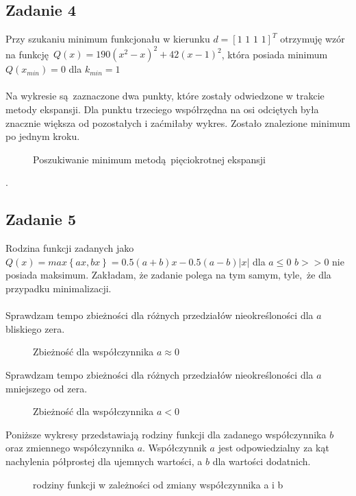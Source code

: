 \documentclass[a4paper, 12pt]{article}
\begin{document}
		\subsection{Zadanie 4}
			Przy szukaniu minimum funkcjonału w kierunku $d = [1\,\, 1\,\, 1\,\, 1]^T$ otrzymuję wzór na funkcję $Q(x) = 190(x^2-x)^2+ 42 (x-1)^2$, która posiada minimum $Q(x_{min}) = 0$ dla $k_{min} = 1$ \\ \\
			Na wykresie są zaznaczone dwa punkty, które zostały odwiedzone w trakcie metody ekspansji. Dla punktu trzeciego współrzędna na osi odciętych była znacznie większa od pozostałych i zaćmiłaby wykres. Zostało znalezione minimum po jednym kroku.
			\begin{figure}[H]
				\centering
				\def \svgwidth{0.7\columnwidth}
				
				\caption{Poszukiwanie minimum metodą pięciokrotnej ekspansji}
			\end{figure}\noindent.
		\subsection{Zadanie 5}
			Rodzina funkcji zadanych jako $Q(x) = max \left\{ax, bx\right\} = 0.5(a + b)x - 0.5(a-b) |x|$  dla $a \leq 0$ $b >> 0$ nie posiada maksimum. Zakładam, że zadanie polega na tym samym, tyle, że dla przypadku minimalizacji. \\ \\
			Sprawdzam tempo zbieżności dla różnych przedziałów nieokreśloności dla $a$ bliskiego zera.
			\begin{figure}[H]
				\centering
				\def \svgwidth{0.7\columnwidth}
				
				\caption{Zbieżność dla współczynnika $a \approx 0 $}
			\end{figure}\noindent
			Sprawdzam tempo zbieżności dla różnych przedziałów nieokreśloności dla $a$ mniejszego od zera.
			\begin{figure}[H]
				\centering
				\def \svgwidth{0.7\columnwidth}
				
				\caption{Zbieżność dla współczynnika $a < 0 $}
			\end{figure}\noindent
			Poniższe wykresy przedstawiają rodziny funkcji dla zadanego współczynnika $b$ oraz zmiennego współczynnika $a$. Współczynnik $a$ jest odpowiedzialny za kąt nachylenia półprostej dla ujemnych wartości, a $b$ dla wartości dodatnich.
			\begin{figure}[H]
				\centering
				\def \svgwidth{\columnwidth}
				
				\caption{rodziny funkcji w zależności od zmiany współczynnika a i b}
			\end{figure}\noindent
\end{document}
